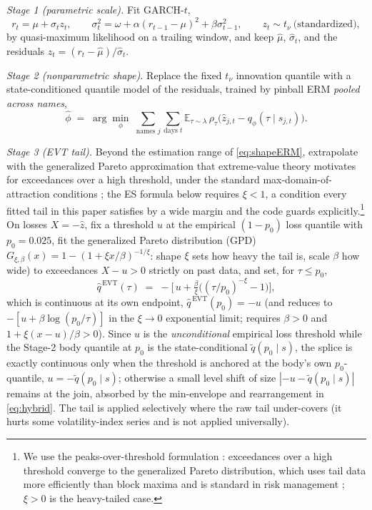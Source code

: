 \documentclass[11pt]{article}
\theoremstyle{remark}
\begin{document}
\emph{Stage 1 (parametric scale).} Fit GARCH-$t$,
\begin{equation}
r_t = \mu + \sigma_t z_t,\qquad
\sigma_t^2 = \omega + \alpha (r_{t-1}-\mu)^2 + \beta \sigma_{t-1}^2,
\qquad z_t \sim t_\nu \ \text{(standardized)},
\label{eq:garch}
\end{equation}
by quasi-maximum likelihood on a trailing window, and keep
$\widehat{\mu}$, $\widehat{\sigma}_t$, and the residuals
$\widehat{z}_t = (r_t-\widehat{\mu})/\widehat{\sigma}_t$.

\emph{Stage 2 (nonparametric shape).} Replace the fixed $t_\nu$
innovation quantile with a state-conditioned quantile model of the
residuals, trained by pinball ERM \emph{pooled across names},
\begin{equation}
\widehat{\phi} \;=\; \arg\min_{\phi}\;
\sum_{\text{names } j}\sum_{\text{days } t}
\mathbb{E}_{\tau\sim\lambda}\,
\rho_\tau\!\big(\widehat{z}_{j,t} - q_\phi(\tau \mid s_{j,t})\big).
\label{eq:shapeERM}
\end{equation}

\emph{Stage 3 (EVT tail).} Beyond the estimation range of
\eqref{eq:shapeERM}, extrapolate with the generalized Pareto
approximation that extreme-value theory motivates for exceedances over
a high threshold, under the standard max-domain-of-attraction
conditions \citep{pickands1975, mcneilfrey2000}; the ES formula below
requires $\xi<1$, a condition every fitted tail in this paper
satisfies by a wide margin and the code guards explicitly.\footnote{We use the peaks-over-threshold formulation
\citep{balkema1974,pickands1975}: exceedances over a high threshold
converge to the generalized Pareto distribution, which uses tail data
more efficiently than block maxima and is standard in risk management
\citep{mcneilfrey2000,embrechts1997}; $\xi>0$ is the heavy-tailed case.} On losses $X=-\widehat{z}$, fix a threshold $u$ at the
empirical $(1-p_0)$ loss quantile with $p_0 = 0.025$, fit the
generalized Pareto distribution (GPD)
$G_{\xi,\beta}(x) = 1-(1+\xi x/\beta)^{-1/\xi}$: shape $\xi$ sets how
heavy the tail is, scale $\beta$ how wide) to exceedances
$X - u > 0$ strictly on past data, and set, for $\tau \le p_0$,
\begin{equation}
\widehat{q}^{\,\mathrm{EVT}}(\tau)
\;=\; -\Big[\, u + \tfrac{\beta}{\xi}\big( (\tau/p_0)^{-\xi} - 1 \big)
\Big],
\label{eq:evt}
\end{equation}
which is continuous at its own endpoint, $\widehat q^{\,\mathrm{EVT}}(p_0)
= -u$ (and reduces to $-[u+\beta\log(p_0/\tau)]$ in the $\xi\to0$
exponential limit; requires $\beta>0$ and $1+\xi(x-u)/\beta>0$). Since
$u$ is the \emph{unconditional} empirical loss threshold while the
Stage-2 body quantile at $p_0$ is the state-conditional
$\widetilde q(p_0\mid s)$, the splice is exactly continuous only when
the threshold is anchored at the body's own $p_0$-quantile,
$u = -\widetilde q(p_0\mid s)$; otherwise a small level shift of size
$|{-}u - \widetilde q(p_0\mid s)|$ remains at the join, absorbed by the
min-envelope and rearrangement in \eqref{eq:hybrid}. The tail is
applied selectively where the raw tail under-covers (it hurts
some volatility-index series and is not applied universally).
\end{document}
